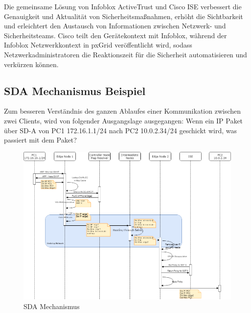 Die gemeinsame Lösung von Infoblox ActiveTrust und Cisco ISE verbessert die Genauigkeit und Aktualität von Sicherheitsmaßnahmen, erhöht die Sichtbarkeit und erleichtert den Austausch von Informationen zwischen Netzwerk- und Sicherheitsteams. Cisco teilt den Gerätekontext mit Infoblox, während der Infoblox Netzwerkkontext in pxGrid veröffentlicht wird, sodass Netzwerkadministratoren die Reaktionszeit für die Sicherheit automatisieren und verkürzen können.\cite{infoblox-communityblog}



\subsection{SDA Mechanismus Beispiel}
Zum besseren Verständnis des ganzen Ablaufes einer Kommunikation zwischen zwei Clients, wird von folgender Ausgangslage ausgegangen: Wenn ein IP Paket über SD-A von PC1 172.16.1.1/24 nach PC2 10.0.2.34/24 geschickt wird, was passiert mit dem Paket?

\begin{figure}[H]
	\centering
	\includegraphics[width=16cm]{img/SDA_Mechanismus-NewVersion.png}
	\caption{SDA Mechanismus}
	\label{fig:SDA Mechanismus}
\end{figure}

